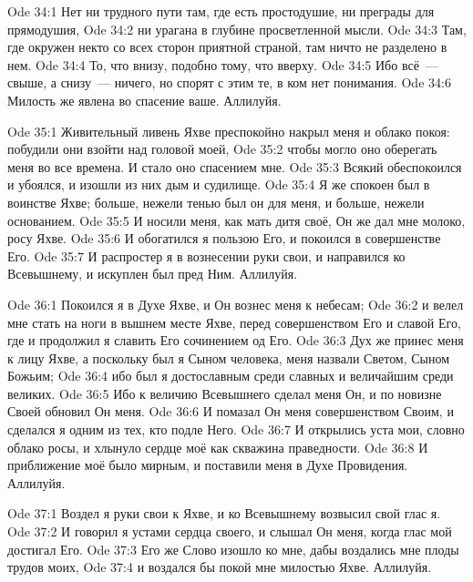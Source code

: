 \vs Ode 34:1
Нет ни
трудного пути там, где есть простодушие, ни преграды для прямодушия,
\vs Ode 34:2
ни урагана в
глубине просветленной мысли.
\vs Ode 34:3
Там, где
окружен некто со всех сторон приятной страной, там ничто не разделено в нем.
\vs Ode 34:4
То, что внизу,
подобно тому, что вверху.
\vs Ode 34:5
Ибо всё~---
свыше, а снизу~--- ничего, но спорят с этим те, в ком нет понимания.
\vs Ode 34:6
Милость же
явлена во спасение ваше.
Аллилуйя.

\vs Ode 35:1
Живительный
ливень Яхве преспокойно накрыл меня и облако покоя: побудили они взойти над
головой моей,
\vs Ode 35:2
чтобы могло
оно оберегать меня во все времена. И стало оно спасением мне.
\vs Ode 35:3
Всякий
обеспокоился и убоялся, и изошли из них дым и судилище.
\vs Ode 35:4
Я же спокоен
был в воинстве Яхве; больше, нежели тенью был он для меня, и больше, нежели
основанием.
\vs Ode 35:5
И носили меня,
как мать дитя своё, Он же дал мне молоко, росу Яхве.
\vs Ode 35:6
И обогатился я
пользою Его, и покоился в совершенстве Его.
\vs Ode 35:7
И распростер я
в вознесении руки свои, и направился ко Всевышнему, и искуплен был пред Ним.
Аллилуйя.

\vs Ode 36:1
Покоился я в
Духе Яхве, и Он вознес меня к небесам;
\vs Ode 36:2
и велел мне
стать на ноги в вышнем месте Яхве, перед совершенством Его и славой Его, где и
продолжил я славить Его сочинением од Его.
\vs Ode 36:3
Дух же принес
меня к лицу Яхве, а поскольку был я Сыном человека, меня назвали Светом, Сыном
Божьим;
\vs Ode 36:4
ибо был я
достославным среди славных и величайшим среди великих.
\vs Ode 36:5
Ибо к величию
Всевышнего сделал меня Он, и по новизне Своей обновил Он меня.
\vs Ode 36:6
И помазал Он
меня совершенством Своим, и сделался я одним из тех, кто подле Него.
\vs Ode 36:7
И открылись
уста мои, словно облако росы, и хлынуло сердце моё как скважина праведности.
\vs Ode 36:8
И приближение
моё было мирным, и поставили меня в Духе Провидения.
Аллилуйя.

\vs Ode 37:1
Воздел я руки
свои к Яхве, и ко Всевышнему возвысил свой глас я.
\vs Ode 37:2
И говорил я
устами сердца своего, и слышал Он меня, когда глас мой достигал Его.
\vs Ode 37:3
Его же Слово
изошло ко мне, дабы воздались мне плоды трудов моих,
\vs Ode 37:4
и воздался бы
покой мне милостью Яхве.
Аллилуйя.

